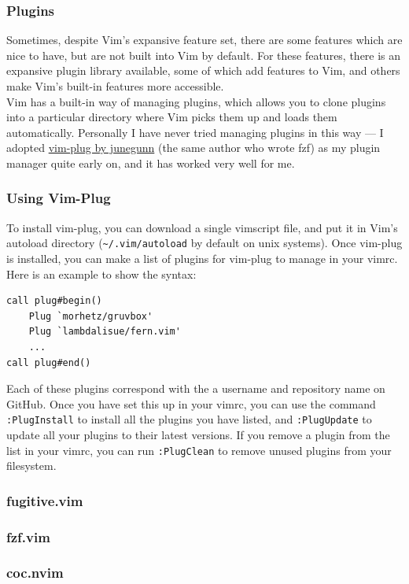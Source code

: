\documentclass{beamer}
\begin{document}
\begin{frame}[fragile]
    \frametitle{Plugins}
    \small
    Sometimes, despite Vim's expansive feature set, there are some features which are nice to have, but are not built into Vim by default. For these features, there is an expansive plugin library available, some of which add features to Vim, and others make Vim's built-in features more accessible.\\
    \vspace{0.5cm}
    Vim has a built-in way of managing plugins, which allows you to clone plugins into a particular directory where Vim picks them up and loads them automatically. Personally I have never tried managing plugins in this way --- I adopted \href{https://github.com/junegunn/vim-plug}{vim-plug by junegunn} (the same author who wrote fzf) as my plugin manager quite early on, and it has worked very well for me.
\end{frame}

\begin{frame}[fragile]
    \frametitle{Using Vim-Plug}
    \small
    To install vim-plug, you can download a single vimscript file, and put it in Vim's autoload directory (\verb+~/.vim/autoload+ by default on unix systems). Once vim-plug is installed, you can make a list of plugins for vim-plug to manage in your vimrc. Here is an example to show the syntax:\\
    \begin{verbatim}
call plug#begin()
    Plug `morhetz/gruvbox'
    Plug `lambdalisue/fern.vim'
    ...
call plug#end()
    \end{verbatim}
    Each of these plugins correspond with the a username and repository name on GitHub. Once you have set this up in your vimrc, you can use the command \verb+:PlugInstall+ to install all the plugins you have listed, and \verb+:PlugUpdate+ to update all your plugins to their latest versions. If you remove a plugin from the list in your vimrc, you can run \verb+:PlugClean+ to remove unused plugins from your filesystem.
\end{frame}

\begin{frame}[fragile]
    \frametitle{fugitive.vim}
    \small
\end{frame}

\begin{frame}[fragile]
    \frametitle{fzf.vim}
    \small
\end{frame}

\begin{frame}[fragile]
    \frametitle{coc.nvim}
    \small
\end{frame}
\end{document}
